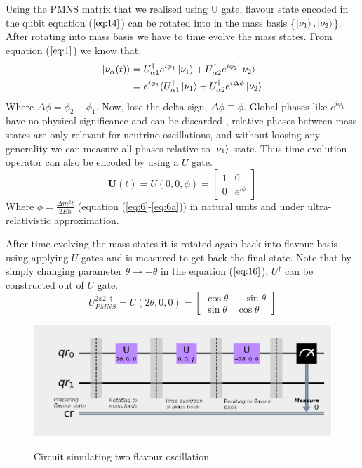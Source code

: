 \documentclass[12pt,a4paper]{report}
\begin{document}
Using the PMNS matrix that we realised using U gate, flavour state encoded in the qubit equation ($\ref{eq:14}$) can be rotated into in the mass basis \{$\ket{\nu_{1}},\ket{\nu_{2}}$\}. After rotating into mass basis we have to time evolve the mass states. From equation ($\ref{eq:1}$) we know that,
\begin{gather*}
\begin{split}
\ket{\nu_{\alpha}(t)}& = U_{\alpha 1}^{\dagger}e^{i\phi_{1}}\ket{\nu_{1}} + U_{\alpha 2}^{\dagger}e^{i\phi_{2}}\ket{\nu_{2}}\\
&=e^{i\phi_{1}}( U_{\alpha 1}^{\dagger}\ket{\nu_{1}} + U_{\alpha 2}^{\dagger} e^{ i\Delta\phi}\ket{\nu_{2}}
\end{split}
\end{gather*}
Where $\Delta\phi= \phi_{2}-\phi_{1}$. Now, lose the delta sign, $\Delta{\phi} \equiv \phi$. Global phases like $e^{i\phi_{1}}$ have no physical significance and can be discarded \cite{Benenti}, relative phases between mass states are only relevant for neutrino oscillations, and without loosing any generality we can measure all phases relative to $\ket{\nu_{1}}$ state. Thus time evolution operator can also be encoded by using a $U$ gate.
\begin{equation}
\textbf{U}(t) = U(0,0,\phi) = \begin{bmatrix} 1 & 0 \\ 0 & e^{i\phi} \end{bmatrix}
\end{equation}
Where $\phi = \frac {\Delta m^{2} t}{2E\hbar}$ (equation (\ref{eq:6}-\ref{eq:6a})) in natural units and under ultra-relativistic approximation.\par
After time evolving the mass states it is rotated again back into flavour basis using applying $U$ gates and is measured to get back the final state. Note that by simply changing parameter $\theta \rightarrow -\theta$ in the equation ($\ref{eq:16}$), $U^{\dagger}$ can be constructed out of $U$ gate. 
\begin{equation}
U_{PMNS}^{2x2 \ \dagger}= U(2\theta,0,0) = \begin{bmatrix} \cos\theta & -\sin\theta \\ \sin\theta & \cos\theta \end{bmatrix}
\end{equation}
\begin{figure}[h]
\graphicspath{ {./Images/} }
\centering	
{\includegraphics[width=\textwidth]{fig_2.png}}
\caption{Circuit simulating two flavour oscillation\cite{jones}}
\label{fig 2}
\end{figure}
\end{document}
